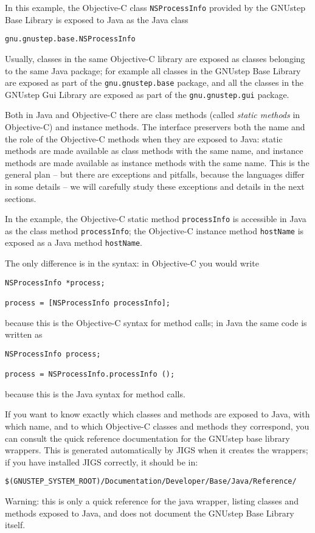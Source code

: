 In this example, the Objective-C class \texttt{NSProcessInfo} provided
by the GNUstep Base Library is exposed to Java as the Java class
\begin{verbatim}
gnu.gnustep.base.NSProcessInfo
\end{verbatim}
Usually, classes in the same Objective-C library are exposed as
classes belonging to the same Java package; for example all classes in
the GNUstep Base Library are exposed as part of the
\texttt{gnu.gnustep.base} package, and all the classes in the GNUstep 
Gui Library are exposed as part of the \texttt{gnu.gnustep.gui}
package.

Both in Java and Objective-C there are class methods (called {\sl static
methods} in Objective-C) and instance methods.  The interface
preservers both the name and the role of the Objective-C methods when
they are exposed to Java: static methods are made available as class
methods with the same name, and instance methods are made available as
instance methods with the same name.  This is the general plan -- but
there are exceptions and pitfalls, because the languages differ in
some details -- we will carefully study these exceptions and details
in the next sections.

In the example, the Objective-C static method \texttt{processInfo} is
accessible in Java as the class method \texttt{processInfo}; the
Objective-C instance method \texttt{hostName} is exposed as a Java
method \texttt{hostName}.

The only difference is in the syntax: in Objective-C you would write
\begin{verbatim}
NSProcessInfo *process;

process = [NSProcessInfo processInfo];
\end{verbatim}
because this is the Objective-C syntax for method calls; in Java the 
same code is written as 
\begin{verbatim}
NSProcessInfo process;

process = NSProcessInfo.processInfo ();
\end{verbatim}
because this is the Java syntax for method calls.

If you want to know exactly which classes and methods are exposed to
Java, with which name, and to which Objective-C classes and methods
they correspond, you can consult the quick reference documentation for
the GNUstep base library wrappers.  This is generated automatically by
JIGS when it creates the wrappers; if you have installed JIGS
correctly, it should be in:
\begin{verbatim}
$(GNUSTEP_SYSTEM_ROOT)/Documentation/Developer/Base/Java/Reference/
\end{verbatim}%
Warning: this is only a quick reference for the java wrapper, listing
classes and methods exposed to Java, and does not document the GNUstep
Base Library itself.

